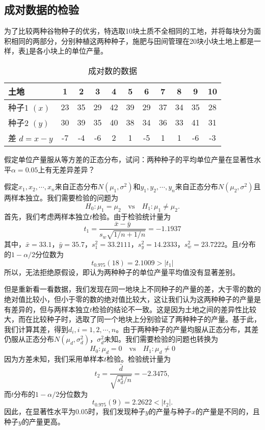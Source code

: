 \subsection{成对数据的检验}
\begin{example}
  为了比较两种谷物种子的优劣，特选取10块土质不全相同的工地，并将每块分为面积相同的两部分，分别种植这两种种子，施肥与田间管理在20块小块土地上都是一样，表\ref{tab:lect22_2}是各小块上的单位产量。
  \begin{table}[ht]
  \centering
  \caption{成对数的数据}\label{tab:lect22_2}
\begin{tabular}{l ccccc  ccccc} 
\hline
{土地} & 1  & 2  & 3  & 4  & 5  & 6  & 7  & 8  & 9  & 10\\ \hline
{种子1 $(x)$} & 23 & 35 & 29 & 42 & 39 & 29 & 37 & 34 & 35 & 28  \\ \hline
{种子2 $(y)$} & 30 & 39 & 35 & 40 & 38 & 34 & 36 & 33 & 41 & 31 \\ \hline
{差 $d=x-y$}   & -7 & -4 & -6 & 2  & 1  & -5 & 1  & 1  & -6 & -3 \\ \hline
\end{tabular}
\end{table}
假定单位产量服从等方差的正态分布，试问：两种种子的平均单位产量在显著性水平$\alpha = 0.05$上有无差异差异？
\end{example}
\begin{solution}
假定$x_1,x_2,\cdots,x_n$来自正态分布$N\left(\mu_{1}, \sigma^{2}\right)$和$y_1,y_2,\cdots,y_n$来自正态分布$N\left(\mu_{2}, \sigma^{2}\right)$且两样本独立。我们需要检验的问题为
$$
H_0: \mu_1 = \mu_2 \quad \text{vs} \quad H_1: \mu_1 \neq \mu_2.
$$
首先，我们考虑两样本独立$t$检验。由于检验统计量为
$$
t_1 = \frac{\bar{x}-\bar{y}}{s_w \sqrt{1/n+1/n}} = -1.1937
$$
其中，$\bar{x}=33.1$，$\bar{y}=35.7$，$s_1^2 = 33.2111$，$s_y^2 = 14.2333$，$s_w^2 = 23.7222$。且$t$分布的$1-\alpha/2$分位数为
$$
t_{0.975}(18) = 2.1009 > |t_1|
$$
所以，无法拒绝原假设，即认为两种种子的单位产量平均值没有显著差别。

但是重新看一看数据，我们发现在同一地块上不同种子的产量的差，大于零的数的绝对值比较小，但小于零的数的绝对值比较大，这让我们认为这两种种子的产量是有差异的，但与两样本独立$t$检验的结论不一致。这是因为土地之间的差异性比较大，而在比较种子时，选取了同一个地块上分别验证了两种种子的产量。基于此，我们计算其差，得到$d_i,i=1,2,\cdots,n$。由于两种种子的产量均服从正态分布，其差仍服从正态分布$N(\mu_d,\sigma_d^2)$，$\sigma_d^2$未知。我们需要检验的问题也转换为
$$
H_0: \mu_d= 0 \quad \text{vs} \quad H_1: \mu_d \neq 0 
$$
因为方差未知，我们采用单样本$t$检验。检验统计量为
$$
t_2 = \frac{\bar{d}}{\sqrt{s_d^2/n}} = -2.3475,
$$
而$t$分布的$1-\alpha/2$分位数为
$$
t_{0.975}(9) = 2.2622 < |t_2|.
$$
因此，在显著性水平为$0.05$时，我们发现种子$y$的产量与种子$x$的产量是不同的，且种子$y$的产量更高。
\end{solution}
